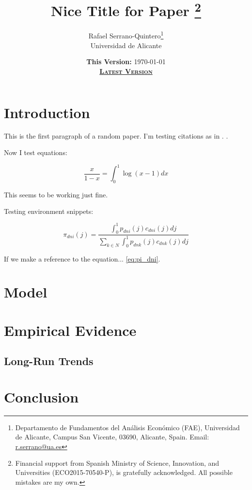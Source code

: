 \documentclass[a4paper,11pt]{article}
\title{\textbf{Nice Title for Paper}
\thanks{Financial support from Spanish Ministry of Science, Innovation, and Universities (ECO2015-70540-P), is gratefully acknowledged. All possible mistakes are my own.}}
\author{Rafael Serrano-Quintero\thanks{Departamento de Fundamentos del An{\'a}lisis Econ{\'o}mico (FAE), Universidad de Alicante, Campus San Vicente, 03690, Alicante, Spain. Email: \href{mailto:r.serrano@ua.es}{r.serrano@ua.es}} \\
Universidad de Alicante}
\date{\textbf{This Version:} \today \\
\href{test_tex.pdf}{\textsc{\textbf{Latest Version}}}}
\begin{document}
\maketitle

\section{Introduction}

This is the first paragraph of a random paper. I'm testing citations as in \citep{rodrik2004hindugrowth,sivasubramonian2004humancapital,hsieh2009misallocation,broadberry2010historical,eichengreen2011servicegrowth,verma2012tfp,ziebarth2013misallocation,garciasantana2014reservationlaws}. \cite{acemoglu2008capitaldeepening,raurich2018labormobility,swiecki2017determinants}.

Now I test equations:

\[
\frac{x}{1-x} = \int^1_0 \log(x-1) dx
\]

This seems to be working just fine. 

Testing environment snippets:

\begin{equation}
	\tag{Trade Share}
	\pi_{dni}(j) = \frac{\int^1_0 p_{dni}(j)c_{dni}(j) dj}{\displaystyle\sum_{k\in N} \int^1_0 p_{dnk}(j)c_{dnk}(j) dj}
	\label{eq:pi_dni}
\end{equation}

If we make a reference to the equation... \eqref{eq:pi_dni}.

\section{Model}

\section{Empirical Evidence}

\subsection{Long-Run Trends}

\section{Conclusion}




\end{document}

